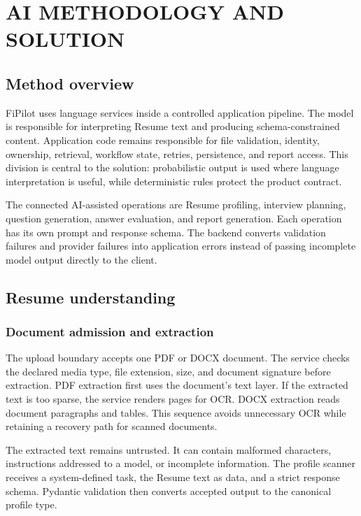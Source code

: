 \chapter{AI METHODOLOGY AND SOLUTION}\label{ch:ai-method}

\section{Method overview}

FiPilot uses language services inside a controlled application pipeline. The model is responsible for interpreting Resume text and producing schema-constrained content. Application code remains responsible for file validation, identity, ownership, retrieval, workflow state, retries, persistence, and report access. This division is central to the solution: probabilistic output is used where language interpretation is useful, while deterministic rules protect the product contract.

The connected AI-assisted operations are Resume profiling, interview planning, question generation, answer evaluation, and report generation. Each operation has its own prompt and response schema. The backend converts validation failures and provider failures into application errors instead of passing incomplete model output directly to the client.

\section{Resume understanding}

\subsection{Document admission and extraction}

The upload boundary accepts one PDF or DOCX document. The service checks the declared media type, file extension, size, and document signature before extraction. PDF extraction first uses the document's text layer. If the extracted text is too sparse, the service renders pages for OCR. DOCX extraction reads document paragraphs and tables. This sequence avoids unnecessary OCR while retaining a recovery path for scanned documents.


The extracted text remains untrusted. It can contain malformed characters, instructions addressed to a model, or incomplete information. The profile scanner receives a system-defined task, the Resume text as data, and a strict response schema. Pydantic validation then converts accepted output to the canonical profile type.

